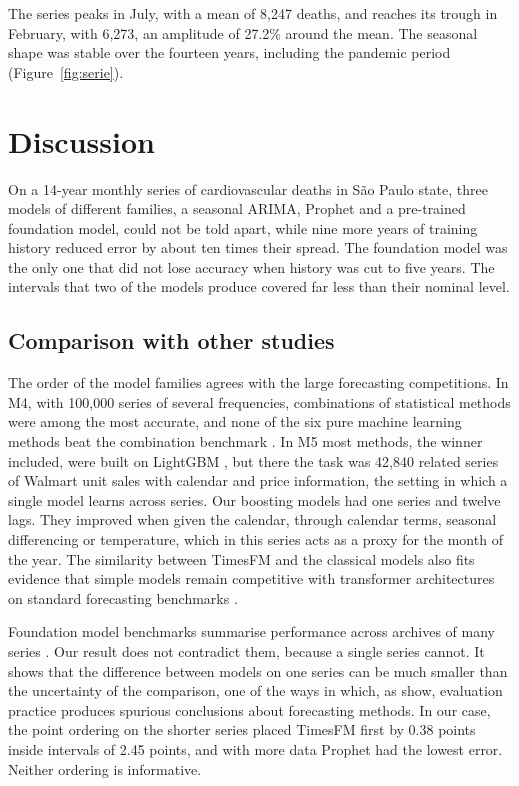The series peaks in July, with a mean of 8{,}247 deaths, and reaches its trough in February,
with 6{,}273, an amplitude of 27.2\% around the mean. The seasonal shape was stable over the
fourteen years, including the pandemic period (Figure~\ref{fig:serie}).

\section{Discussion}

On a 14-year monthly series of cardiovascular deaths in S\~ao Paulo state, three models of
different families, a seasonal ARIMA, Prophet and a pre-trained foundation model, could not
be told apart, while nine more years of training history reduced error by about ten times
their spread. The foundation model was the only one that did not lose accuracy when history
was cut to five years. The intervals that two of the models produce covered far less than
their nominal level.

\subsection{Comparison with other studies}

The order of the model families agrees with the large forecasting competitions. In M4, with
100{,}000 series of several frequencies, combinations of statistical methods were among the
most accurate, and none of the six pure machine learning methods beat the combination
benchmark \citep{makridakis2018, makridakis2020}. In M5 most methods, the winner included, were built on LightGBM
\citep{makridakis2022}, but there the task was 42{,}840 related series of Walmart unit sales with calendar and price
information, the setting in which a single model learns across series. Our boosting models had
one series and twelve lags. They improved when given the calendar, through calendar terms,
seasonal differencing or temperature, which in this series acts as a proxy for the month of
the year. The similarity between TimesFM and the classical models also fits evidence that
simple models remain competitive with transformer architectures on standard forecasting
benchmarks \citep{zeng2023}.

Foundation model benchmarks summarise performance across archives of many series
\citep{godahewa2021, aksu2024}. Our result does not contradict them, because a single
series cannot. It shows that the difference between models on one series can be much
smaller than the uncertainty of the comparison, one of the ways in which, as
\citet{hewamalage2023} show, evaluation practice produces spurious conclusions about
forecasting methods. In
our case, the point ordering on the shorter series placed TimesFM first by 0.38 points
inside intervals of 2.45 points, and with more data Prophet had the lowest error. Neither
ordering is informative.

